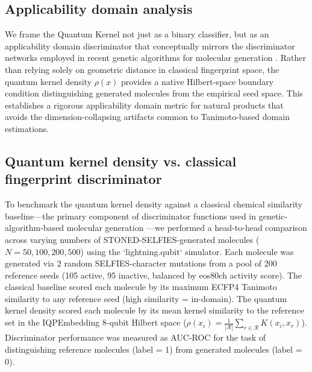 \documentclass[11pt,a4paper]{article}
\begin{document}
\subsection{Applicability domain analysis}\label{sec:applicability_domain}

We frame the Quantum Kernel not just as a binary classifier, but as an applicability domain discriminator that conceptually mirrors the discriminator networks employed in recent genetic algorithms for molecular generation \citep{jensen2019augmenting}. Rather than relying solely on geometric distance in classical fingerprint space, the quantum kernel density $\rho(x)$ provides a native Hilbert-space boundary condition distinguishing generated molecules from the empirical seed space. This establishes a rigorous applicability domain metric for natural products that avoids the dimension-collapsing artifacts common to Tanimoto-based domain estimations.

\subsection{Quantum kernel density vs. classical fingerprint discriminator}

To benchmark the quantum kernel density against a classical chemical similarity baseline---the primary component of discriminator functions used in genetic-algorithm-based molecular generation \citep{jensen2019augmenting}---we performed a head-to-head comparison across varying numbers of STONED-SELFIES-generated molecules ($N = 50, 100, 200, 500$) using the `lightning.qubit` simulator. Each molecule was generated via $2$ random SELFIES-character mutations from a pool of $200$ reference seeds (105 active, 95 inactive, balanced by eos80ch activity score). The classical baseline scored each molecule by its maximum ECFP4 Tanimoto similarity to any reference seed (high similarity = in-domain). The quantum kernel density scored each molecule by its mean kernel similarity to the reference set in the IQPEmbedding 8-qubit Hilbert space ($\rho(x_i) = \frac{1}{|\mathcal{R}|}\sum_{r \in \mathcal{R}} K(x_i, x_r)$). Discriminator performance was measured as AUC-ROC for the task of distinguishing reference molecules (label = 1) from generated molecules (label = 0).
\end{document}
